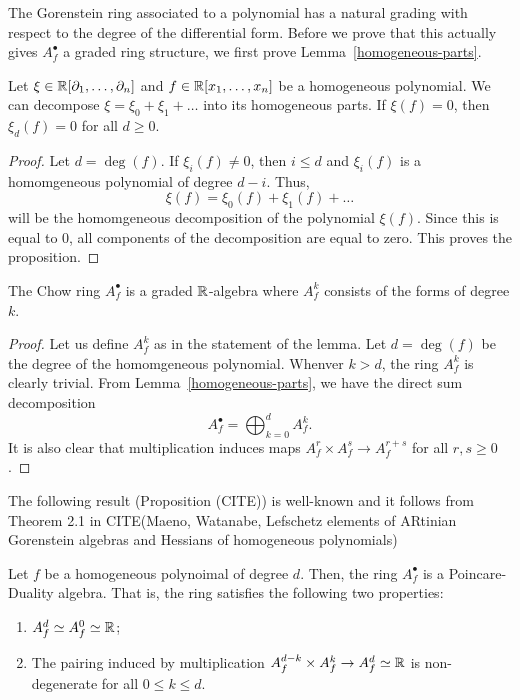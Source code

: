 \documentclass{puthesis-UG}
\begin{document}
The Gorenstein ring associated to a polynomial has a natural grading with respect to the degree of the differential form. Before we prove that this actually gives $A_f^\bullet$ a graded ring structure, we first prove Lemma~\ref{homogeneous-parts}.

\begin{lem} \label{homogeneous-parts}
	Let $\xi \in \mathbb{R}[\partial_1, \ldots, \partial_n]$ and $f \in \mathbb{R}[x_1, \ldots, x_n]$ be a homogeneous polynomial. We can decompose $\xi = \xi_0 + \xi_1 + \ldots$ into its homogeneous parts. If $\xi (f) = 0$, then $\xi_d (f) = 0$ for all $d \geq 0$. 
\end{lem}

\begin{proof}
	Let $d = \deg (f)$. If $\xi_i (f) \neq 0$, then $i \leq d$ and $\xi_i(f)$ is a homomgeneous polynomial of degree $d-i$. Thus, 
	\[
		\xi (f) = \xi_0 (f) + \xi_1(f) + \ldots
	\]
	will be the homomgeneous decomposition of the polynomial $\xi(f)$. Since this is equal to $0$, all components of the decomposition are equal to zero. This proves the proposition. 
\end{proof}

\begin{prop}
	The Chow ring $A_f^\bullet$ is a graded $\mathbb{R}$-algebra where $A_f^k$ consists of the forms of degree $k$. 
\end{prop}

\begin{proof}
	Let us define $A_f^k$ as in the statement of the lemma. Let $d = \deg (f)$ be the degree of the homomgeneous polynomial. Whenver $k > d$, the ring $A_f^k$ is clearly trivial. From Lemma~\ref{homogeneous-parts}, we have the direct sum decomposition 
	\[
		A_f^\bullet = \bigoplus_{k = 0}^d A_f^k.
	\]
	It is also clear that multiplication induces maps $A_f^r \times A_f^s \to A_f^{r+s}$ for all $r, s \geq 0$.
\end{proof}

The following result (Proposition (CITE)) is well-known and it follows from Theorem 2.1 in CITE(Maeno, Watanabe, Lefschetz elements of ARtinian Gorenstein algebras and Hessians of homogeneous polynomials)
\begin{prop} \label{chow-ring-is-a-PD-algebra}
	Let $f$ be a homogeneous polynoimal of degree $d$. Then, the ring $A_f^\bullet$ is a Poincare-Duality algebra. That is, the ring satisfies the following two properties:
	\begin{enumerate}[label = (\alph*)]
		\item $A_f^d \simeq A_f^0 \simeq \mathbb{R}$;

		\item The pairing induced by multiplication $A_f^{d-k} \times A_f^k \to A_f^d \simeq \mathbb{R}$ is non-degenerate for all $0 \leq k \leq d$. 
	\end{enumerate}
\end{prop}
\end{document}
